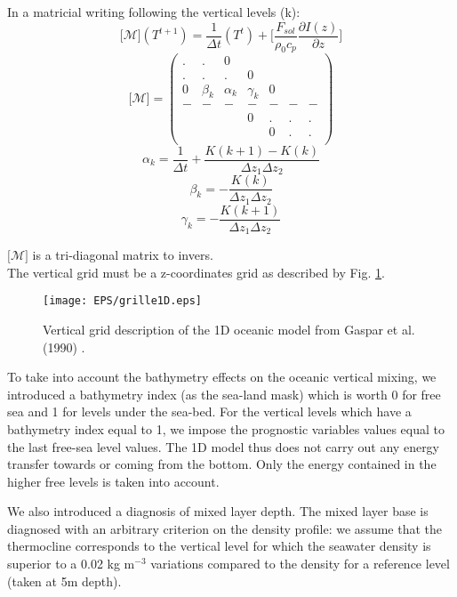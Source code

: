 In a matricial writing following the vertical levels (k):
\begin{equation}
\lbrack\mathcal{M}\rbrack\left(T^{t+1}\right)=\frac{1}{\Delta t}\left(T^{t}\right)+\lbrack\frac{F_{sol}}{\rho_{0}c_{p}}\frac{\partial I(z)}{\partial z}\rbrack
\end{equation}
\begin{equation}
\lbrack\mathcal{M}\rbrack=\left(
\begin{array}{ccccccc}
. & . & 0 & & & & \\
. & . & . & 0 & & & \\
0 & \beta_{k} & \alpha_{k} & \gamma_{k} & 0 & &\\
- & - & - & - & - & - & - \\
 & & & 0 & . & . & .\\
 & & & & 0 & . & .\\
\end{array}
\right)
\end{equation}
$$\alpha_{k}=\frac{1}{\Delta t}+\frac{K(k+1)-K(k)}{\Delta z_{1}\Delta z_{2}}$$
$$\beta_{k}=-\frac{K(k)}{\Delta z_{1}\Delta z_{2}}$$
$$\gamma_{k}=-\frac{K(k+1)}{\Delta z_{1}\Delta z_{2}}$$

$\lbrack\mathcal{M}\rbrack$ is a tri-diagonal matrix to invers. \\

The vertical grid must be a z-coordinates grid as described by Fig. \ref{grille1}. 
\begin{figure}[!h]
\centering\texttt{[image: EPS/grille1D.eps]}
\caption{Vertical grid description of the 1D oceanic model from Gaspar et al. (1990) %
.  \label{grille1}}
\end{figure}

To take into account the bathymetry effects on the oceanic vertical mixing, we introduced a bathymetry index (as the sea-land mask) which is worth 0 for free sea and 1 for levels under the sea-bed. For the vertical levels which have a bathymetry index equal to 1, we impose the prognostic variables values equal to the last free-sea level values. The 1D model thus does not carry out any energy transfer towards or coming from the bottom. Only the energy contained in the higher free levels is taken into account. 

We also introduced a diagnosis of mixed layer depth. The mixed layer base is diagnosed with an arbitrary criterion on the density profile: we assume that the thermocline corresponds to the vertical level for which the seawater density is superior to a 0.02 kg m$^{-3}$ variations compared to the density for a reference level (taken at 5m depth).  

